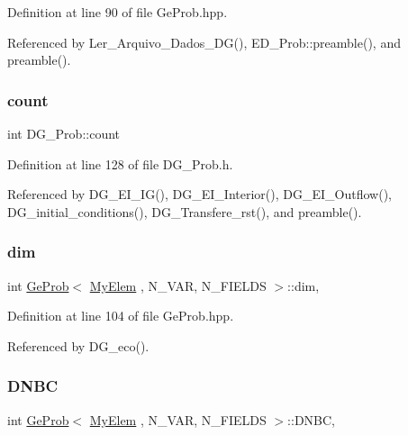 Definition at line 90 of file Ge\+Prob.\+hpp.



Referenced by Ler\+\_\+\+Arquivo\+\_\+\+Dados\+\_\+\+D\+G(), E\+D\+\_\+\+Prob\+::preamble(), and preamble().

\mbox{\label{classDG__Prob_a638611f0f0a04508f43ac7554bc8c7e2}} 
\subsubsection{\texorpdfstring{count}{count}}
{\footnotesize\ttfamily int D\+G\+\_\+\+Prob\+::count\hspace{0.3cm}{\ttfamily [private]}}



Definition at line 128 of file D\+G\+\_\+\+Prob.\+h.



Referenced by D\+G\+\_\+\+E\+I\+\_\+\+I\+G(), D\+G\+\_\+\+E\+I\+\_\+\+Interior(), D\+G\+\_\+\+E\+I\+\_\+\+Outflow(), D\+G\+\_\+initial\+\_\+conditions(), D\+G\+\_\+\+Transfere\+\_\+rst(), and preamble().

\mbox{\label{classGeProb_a122f6dbb7e9a60a35f257ae369a57f77}} 
\subsubsection{\texorpdfstring{dim}{dim}}
{\footnotesize\ttfamily int \hyperlink{classGeProb}{Ge\+Prob}$<$ \hyperlink{DG__Prob_8h_a83cd887ced9a6587428f267e50cd4787}{My\+Elem} , N\+\_\+\+V\+AR, N\+\_\+\+F\+I\+E\+L\+DS $>$\+::dim\hspace{0.3cm}{\ttfamily [protected]}, {\ttfamily [inherited]}}



Definition at line 104 of file Ge\+Prob.\+hpp.



Referenced by D\+G\+\_\+eco().

\mbox{\label{classGeProb_a416b1ac091d91a8959a4ff2518948466}} 
\subsubsection{\texorpdfstring{D\+N\+BC}{DNBC}}
{\footnotesize\ttfamily int \hyperlink{classGeProb}{Ge\+Prob}$<$ \hyperlink{DG__Prob_8h_a83cd887ced9a6587428f267e50cd4787}{My\+Elem} , N\+\_\+\+V\+AR, N\+\_\+\+F\+I\+E\+L\+DS $>$\+::D\+N\+BC\hspace{0.3cm}{\ttfamily [protected]}, {\ttfamily [inherited]}}



